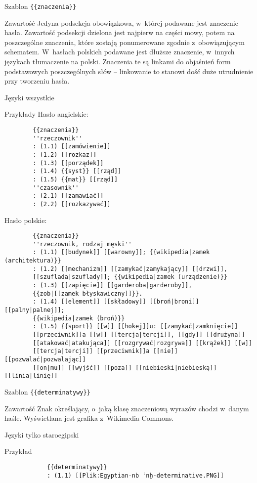 \begin{opis}
	\item[Szablon] \verb|{{znaczenia}}|
	\item[Zawartość] Jedyna podsekcja obowiązkowa, w~której podawane jest znaczenie hasła. Zawartość podsekcji dzielona jest najpierw na części mowy, potem na poszczególne znaczenia, które zostają ponumerowane zgodnie z~obowiązującym schematem. W~hasłach polskich podawane jest dłuższe znaczenie, w~innych językach tłumaczenie na polski. Znaczenia te są linkami do objaśnień form podstawowych poszczególnych słów -- linkowanie to stanowi dość duże utrudnienie przy tworzeniu hasła.
	\item[Języki] wszystkie
	\item[Przykłady] Hasło angielskie:
		\begin{verbatim}
		{{znaczenia}}
		''rzeczownik''
		: (1.1) [[zamówienie]]
		: (1.2) [[rozkaz]]
		: (1.3) [[porządek]]
		: (1.4) {{syst}} [[rząd]]
		: (1.5) {{mat}} [[rząd]]
		''czasownik''
		: (2.1) [[zamawiać]]
		: (2.2) [[rozkazywać]]
		\end{verbatim}
		Hasło polskie:
		\begin{verbatim}
		{{znaczenia}}
		''rzeczownik, rodzaj męski''
		: (1.1) [[budynek]] [[warowny]]; {{wikipedia|zamek (architektura)}}
		: (1.2) [[mechanizm]] [[zamykać|zamykający]] [[drzwi]],
		[[szuflada|szuflady]]; {{wikipedia|zamek (urządzenie)}}
		: (1.3) [[zapięcie]] [[garderoba|garderoby]],
		{{zob|[[zamek błyskawiczny]]}}.
		: (1.4) [[element]] [[składowy]] [[broń|broni]] [[palny|palnej]];
		{{wikipedia|zamek (broń)}}
		: (1.5) {{sport}} [[w]] [[hokej]]u: [[zamykać|zamknięcie]]
		[[przeciwnik]]a [[w]] [[tercja|tercji]], [[gdy]] [[drużyna]]
		[[atakować|atakująca]] [[rozgrywać|rozgrywa]] [[krążek]] [[w]]
		[[tercja|tercji]] [[przeciwnik]]a [[nie]] [[pozwalać|pozwalając]]
		[[on|mu]] [[wyjść]] [[poza]] [[niebieski|niebieską]] [[linia|linię]]
		\end{verbatim}
\end{opis}
\spacer
\begin{opis}
	\item[Szablon] \verb|{{determinatywy}}|
	\item[Zawartość] Znak określający, o~jaką klasę znaczeniową wyrazów chodzi w~danym haśle. Wyświetlana jest grafika z~Wikimedia Commons.
	\item[Języki] tylko staroegipski
	\item[Przykład]
		\begin{verbatim}
			{{determinatywy}}
			: (1.1) [[Plik:Egyptian-nb ʿnḫ-determinative.PNG]]
		\end{verbatim}
\end{opis}
